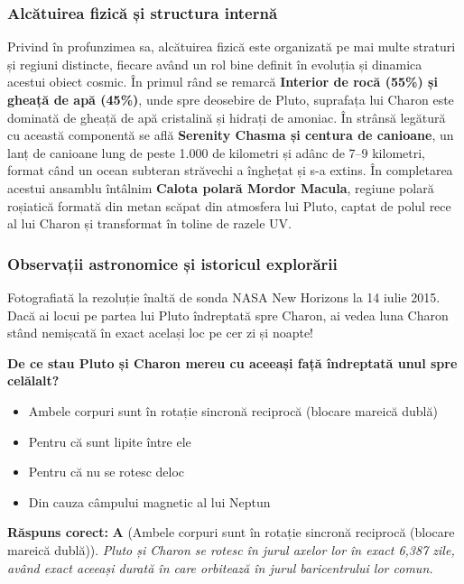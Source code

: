 \subsubsection*{Alcătuirea fizică și structura internă}
Privind în profunzimea sa, alcătuirea fizică este organizată pe mai multe straturi și regiuni distincte, fiecare având un rol bine definit în evoluția și dinamica acestui obiect cosmic. În primul rând se remarcă \textbf{Interior de rocă (55\%) și gheață de apă (45\%)}, unde spre deosebire de Pluto, suprafața lui Charon este dominată de gheață de apă cristalină și hidrați de amoniac. În strânsă legătură cu această componentă se află \textbf{Serenity Chasma și centura de canioane}, un lanț de canioane lung de peste 1.000 de kilometri și adânc de 7--9 kilometri, format când un ocean subteran străvechi a înghețat și s-a extins. În completarea acestui ansamblu întâlnim \textbf{Calota polară Mordor Macula}, regiune polară roșiatică formată din metan scăpat din atmosfera lui Pluto, captat de polul rece al lui Charon și transformat în toline de razele UV.

\subsubsection*{Observații astronomice și istoricul explorării}
Fotografiată la rezoluție înaltă de sonda NASA New Horizons la 14 iulie 2015. Dacă ai locui pe partea lui Pluto îndreptată spre Charon, ai vedea luna Charon stând nemișcată în exact același loc pe cer zi și noapte!

\vspace{6pt}
\begin{tcolorbox}[orbitarquiz, title={\textbf{Întrebare de verificare \#34: Charon}}]
\textbf{De ce stau Pluto și Charon mereu cu aceeași față îndreptată unul spre celălalt?}
\begin{itemize}[leftmargin=2.2em, itemsep=2pt, topsep=4pt]
  \item[$\square$ \textbf{A.}] Ambele corpuri sunt în rotație sincronă reciprocă (blocare mareică dublă)
  \item[$\square$ \textbf{B.}] Pentru că sunt lipite între ele
  \item[$\square$ \textbf{C.}] Pentru că nu se rotesc deloc
  \item[$\square$ \textbf{D.}] Din cauza câmpului magnetic al lui Neptun
\end{itemize}
\vspace{2pt}
{\footnotesize\color{orbitarMuted}\textbf{Răspuns corect:} \textbf{A} (Ambele corpuri sunt în rotație sincronă reciprocă (blocare mareică dublă)). \emph{Pluto și Charon se rotesc în jurul axelor lor în exact 6,387 zile, având exact aceeași durată în care orbitează în jurul baricentrului lor comun.}}
\end{tcolorbox}
\clearpage


